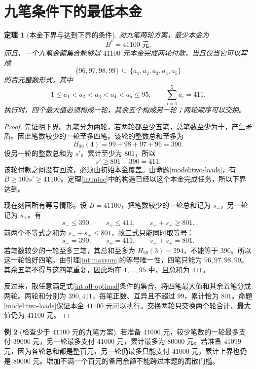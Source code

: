 \documentclass[UTF8,a4paper]{ctexbook}
\newtheorem{theorem}{定理}[chapter]
\theoremstyle{definition}
\newtheorem{example}[theorem]{例}
\numberwithin{equation}{chapter}
\newcommand{\1}{\mathbf{1}}
\begin{document}
\section{九笔条件下的最低本金}
\begin{theorem}[本金下界与达到下界的条件]\label{int:capital}
对九笔两轮方案，最少本金为
\[
\boxed{B^*=41100\text{ 元}}.
\]
而且，一个九笔金额集合能够以 $41100$ 元本金完成两轮付款，当且仅当它可以写成
\begin{equation}\label{int:all-optimal}
\{96,97,98,99\}\ \cup\ \{a_1,a_2,a_3,a_4,a_5\}
\end{equation}
的百元整数形式，其中
\[
1\le a_1<a_2<a_3<a_4<a_5\le95,
\qquad \sum_{i=1}^{5}a_i=411.
\]
执行时，四个最大值必须构成一轮，其余五个构成另一轮；两轮顺序可以交换。
\end{theorem}
\begin{proof}
先证明下界。九笔分为两轮，若两轮都至少五笔，总笔数至少为十，产生矛盾。因此笔数较少的一轮至多四笔。该轮的整数总和至多为
\[
H_{99}(4)=99+98+97+96=390.
\]
设另一轮的整数总和为 $s'$。累计至少为 $801$，所以
\[
s'\ge801-390=411.
\]
该轮付款之间没有回流，必须由初始本金覆盖。由命题\ref{model:two-loads}，有 $B\ge100s'\ge41100$。定理\ref{int:nine}中的构造已经以这个本金完成任务，所以下界达到。

现在刻画所有等号情形。设 $B=41100$，把笔数较少的一轮总和记为 $s_-$，另一轮记为 $s_+$。有
\[
s_-\le390,\qquad s_+\le411,\qquad s_-+s_+\ge801.
\]
前两个不等式之和为 $s_-+s_+\le801$，故三式只能同时取等号：
\begin{equation}\label{int:equality-loads}
s_-=390,\qquad s_+=411,\qquad s_-+s_+=801.
\end{equation}
若笔数较少的一轮至多三笔，其总和至多为 $H_{99}(3)=294$，不能等于 $390$。所以这一轮恰好四笔。由引理\ref{int:maxsum}的等号唯一性，四笔只能为 $96,97,98,99$。其余五笔不得与这四笔重复，因此均在 $1,\ldots,95$ 中，且总和为 $411$。

反过来，取任意满足式\eqref{int:all-optimal}条件的集合，将四笔最大值和其余五笔分成两轮。两轮和分别为 $390,411$，每笔正数、互异且不超过 $99$，累计恰为 $801$。命题\ref{model:two-loads}保证本金 $41100$ 元可以执行。交换两轮只交换两个轮合计，最大值仍为 $41100$ 元。
\end{proof}

\begin{example}[检查少于 $41100$ 元的九笔方案]
若准备 $41000$ 元，较少笔数的一轮最多支付 $39000$ 元，另一轮最多支付 $41000$ 元，累计最多为 $80000$ 元。若准备 $41099$ 元，因为各轮总和都是整百元，另一轮仍最多只能支付 $41000$ 元，累计上界也仍是 $80000$ 元。增加不满一个百元的备用余额不能跨过本题的离散门槛。
\end{example}
\end{document}
